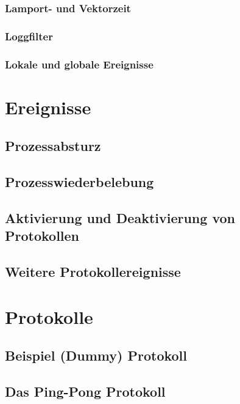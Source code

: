 \subsubsection{Lamport- und Vektorzeit}

\subsubsection{Loggfilter}

\subsubsection{Lokale und globale Ereignisse}

\section{Ereignisse}

\subsection{Prozessabsturz}

\subsection{Prozesswiederbelebung}

\subsection{Aktivierung und Deaktivierung von Protokollen}

\subsection{Weitere Protokollereignisse}

\section{Protokolle}

\subsection{Beispiel (Dummy) Protokoll}

\subsection{Das Ping-Pong Protokoll}

